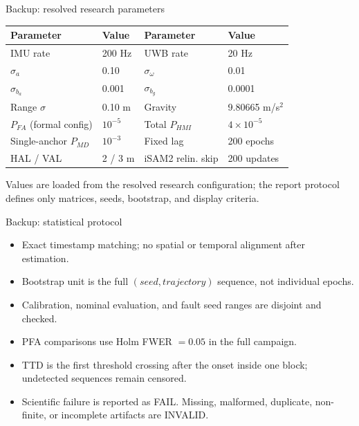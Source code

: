 \documentclass[aspectratio=169,10pt]{beamer}
\begin{document}
\begin{frame}{Backup: resolved research parameters}
\scriptsize
\begin{tabular}{ll@{\qquad}ll}
\toprule
Parameter & Value & Parameter & Value\\\midrule
IMU rate & 200 Hz & UWB rate & 20 Hz\\
$\sigma_a$ & 0.10 & $\sigma_\omega$ & 0.01\\
$\sigma_{b_a}$ & 0.001 & $\sigma_{b_g}$ & 0.0001\\
Range $\sigma$ & 0.10 m & Gravity & 9.80665 m/s$^2$\\
$P_{FA}$ (formal config) & $10^{-5}$ & Total $P_{HMI}$ & $4\times10^{-5}$\\
Single-anchor $P_{MD}$ & $10^{-3}$ & Fixed lag & 200 epochs\\
HAL / VAL & 2 / 3 m & iSAM2 relin. skip & 200 updates\\
\bottomrule
\end{tabular}
\vspace{.6em}
Values are loaded from the resolved research configuration; the report protocol defines only matrices, seeds, bootstrap, and display criteria.
\end{frame}

\begin{frame}{Backup: statistical protocol}
\begin{itemize}
\item Exact timestamp matching; no spatial or temporal alignment after estimation.
\item Bootstrap unit is the full $(seed,trajectory)$ sequence, not individual epochs.
\item Calibration, nominal evaluation, and fault seed ranges are disjoint and checked.
\item PFA comparisons use Holm FWER $=0.05$ in the full campaign.
\item TTD is the first threshold crossing after the onset inside one block; undetected sequences remain censored.
\item Scientific failure is reported as FAIL. Missing, malformed, duplicate, non-finite, or incomplete artifacts are INVALID.
\end{itemize}
\end{frame}
\end{document}
